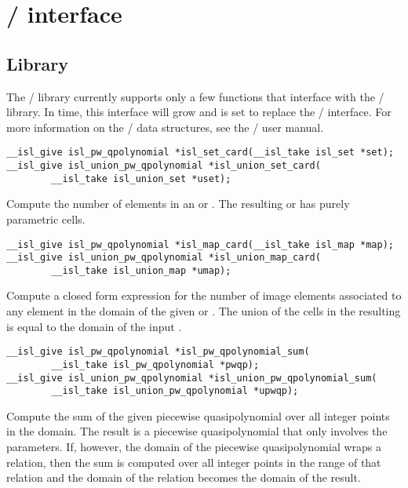 \section{\protect\isl/ interface}

\let\llt\prec
\let\lle\preccurlyeq
\let\lgt\succ

\subsection{Library}

The \barvinok/ library currently supports only a few
functions that interface with the \isl/ library.
In time, this interface will grow and is set to replace
the \PolyLib/ interface.
For more information on the \isl/ data structures, see
the \isl/ user manual.

\begin{verbatim}
__isl_give isl_pw_qpolynomial *isl_set_card(__isl_take isl_set *set);
__isl_give isl_union_pw_qpolynomial *isl_union_set_card(
        __isl_take isl_union_set *uset);
\end{verbatim}
Compute the number of elements in an 
or .
The resulting 
or  has purely parametric cells.

\begin{verbatim}
__isl_give isl_pw_qpolynomial *isl_map_card(__isl_take isl_map *map);
__isl_give isl_union_pw_qpolynomial *isl_union_map_card(
        __isl_take isl_union_map *umap);
\end{verbatim}
Compute a closed form expression for the number of image elements
associated to any element in the domain of the given 
or .
The union of the cells in the resulting 
is equal to the domain of the input .

\begin{verbatim}
__isl_give isl_pw_qpolynomial *isl_pw_qpolynomial_sum(
        __isl_take isl_pw_qpolynomial *pwqp);
__isl_give isl_union_pw_qpolynomial *isl_union_pw_qpolynomial_sum(
        __isl_take isl_union_pw_qpolynomial *upwqp);
\end{verbatim}
Compute the sum of the given piecewise quasipolynomial over
all integer points in the domain.  The result is a piecewise
quasipolynomial that only involves the parameters.
If, however, the domain of the piecewise quasipolynomial wraps
a relation, then the sum is computed over all integer points
in the range of that relation and the domain of the relation
becomes the domain of the result.

